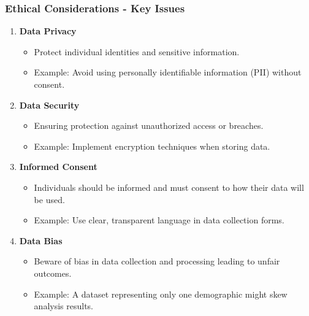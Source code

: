 \documentclass[aspectratio=169]{beamer}
\begin{document}
\begin{frame}[fragile]
    \frametitle{Ethical Considerations - Key Issues}
    \begin{enumerate}
        \item \textbf{Data Privacy}
            \begin{itemize}
                \item Protect individual identities and sensitive information.
                \item Example: Avoid using personally identifiable information (PII) without consent.
            \end{itemize}
        \item \textbf{Data Security}
            \begin{itemize}
                \item Ensuring protection against unauthorized access or breaches.
                \item Example: Implement encryption techniques when storing data.
            \end{itemize}
        \item \textbf{Informed Consent}
            \begin{itemize}
                \item Individuals should be informed and must consent to how their data will be used.
                \item Example: Use clear, transparent language in data collection forms.
            \end{itemize}
        \item \textbf{Data Bias}
            \begin{itemize}
                \item Beware of bias in data collection and processing leading to unfair outcomes.
                \item Example: A dataset representing only one demographic might skew analysis results.
            \end{itemize}
    \end{enumerate}
\end{frame}
\end{document}
